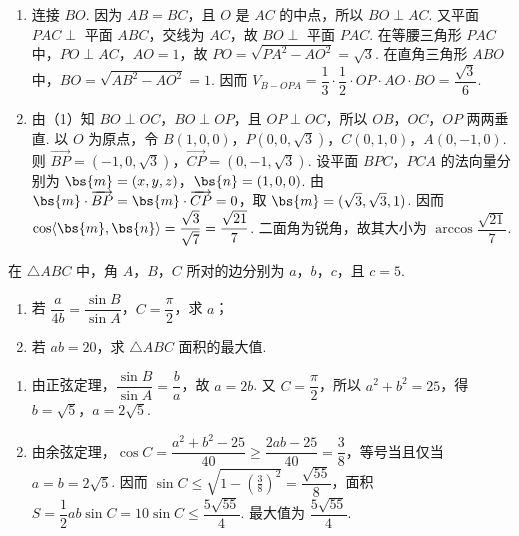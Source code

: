 \documentclass[UTF8,a4paper,oneside,11pt]{ctexbook}
\begin{document}
\begin{solution}
\begin{enumerate}
\item 连接 \(BO\). 因为 \(AB=BC\)，且 \(O\) 是 \(AC\) 的中点，所以 \(BO\perp AC\). 又平面 \(PAC\perp\) 平面 \(ABC\)，交线为 \(AC\)，故 \(BO\perp\) 平面 \(PAC\). 在等腰三角形 \(PAC\) 中，\(PO\perp AC\)，\(AO=1\)，故 \(PO=\sqrt{PA^2-AO^2}=\sqrt3\). 在直角三角形 \(ABO\) 中，\(BO=\sqrt{AB^2-AO^2}=1\). 因而 \(V_{B-OPA}=\dfrac13\cdot\dfrac12\cdot OP\cdot AO\cdot BO=\dfrac{\sqrt3}{6}\).
\item 由（1）知 \(BO\perp OC\)，\(BO\perp OP\)，且 \(OP\perp OC\)，所以 \(OB\)，\(OC\)，\(OP\) 两两垂直. 以 \(O\) 为原点，令 \(B(1,0,0)\)，\(P(0,0,\sqrt3)\)，\(C(0,1,0)\)，\(A(0,-1,0)\). 则
\(\overrightarrow{BP}=(-1,0,\sqrt3)\)，\(\overrightarrow{CP}=(0,-1,\sqrt3)\). 设平面 \(BPC\)，\(PCA\) 的法向量分别为 \(\bs{m}=(x,y,z)\)，\(\bs{n}=(1,0,0)\). 由 \(\bs{m}\cdot\overrightarrow{BP}=\bs{m}\cdot\overrightarrow{CP}=0\)，取 \(\bs{m}=(\sqrt3,\sqrt3,1)\). 因而 \(\cos\langle\bs{m},\bs{n}\rangle=\dfrac{\sqrt3}{\sqrt7}=\dfrac{\sqrt{21}}7\). 二面角为锐角，故其大小为 \(\arccos\dfrac{\sqrt{21}}7\).
\end{enumerate}
\end{solution}

\begin{problem}
在 \(\triangle ABC\) 中，角 \(A\)，\(B\)，\(C\) 所对的边分别为 \(a\)，\(b\)，\(c\)，且 \(c=5\).
\begin{enumerate}
\item 若 \(\dfrac{a}{4b}=\dfrac{\sin B}{\sin A}\)，\(C=\dfrac\pi2\)，求 \(a\)；
\item 若 \(ab=20\)，求 \(\triangle ABC\) 面积的最大值.
\end{enumerate}
\end{problem}

\begin{solution}
\begin{enumerate}
\item 由正弦定理，\(\dfrac{\sin B}{\sin A}=\dfrac ba\)，故 \(a=2b\). 又 \(C=\dfrac\pi2\)，所以 \(a^2+b^2=25\)，得 \(b=\sqrt5\)，\(a=2\sqrt5\).
\item 由余弦定理，\(\cos C=\dfrac{a^2+b^2-25}{40}\ge\dfrac{2ab-25}{40}=\dfrac38\)，等号当且仅当 \(a=b=2\sqrt5\). 因而 \(\sin C\le\sqrt{1-(\frac{3}{8})^2}=\dfrac{\sqrt{55}}8\)，面积 \(S=\dfrac12ab\sin C=10\sin C\le\dfrac{5\sqrt{55}}4\). 最大值为 \(\dfrac{5\sqrt{55}}4\).
\end{enumerate}
\end{solution}
\end{document}
